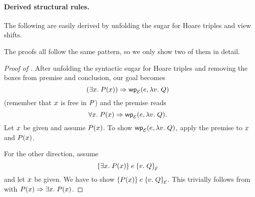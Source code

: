 \paragraph{Derived structural rules.}
The following are easily derived by unfolding the sugar for Hoare triples and view shifts.
The proofs all follow the same pattern, so we only show two of them in detail.
\begin{proof}[Proof of ]
	After unfolding the syntactic sugar for Hoare triples and removing the boxes from premise and conclusion, our goal becomes
	\[
		(\Exists \var. \prop(\var)) \Ra \dynA{\expr}{\Lam\val. \propB}{\mask}
	\]
	(remember that $x$ is free in $P$) and the premise reads
	\[
		\All \var. \prop(\var) \Ra \dynA{\expr}{\Lam\val. \propB}{\mask}.
	\]
	Let $x$ be given and assume $P(x)$.
	To show $\dynA{\expr}{\Lam\val. \propB}{\mask}$, apply the premise to $x$ and $P(x)$.
 
	For the other direction, assume
	\[
		\hoare{\Exists \var. \prop(\var)}{\expr}{\Ret\val. \propB}[\mask]
	\]
	and let $x$ be given.
	We have to show $\hoare{\prop(\var)}{\expr}{\Ret\val. \propB}[\mask]$.
	This trivially follows from  with $\prop(\var) \Ra \Exists \var. \prop(\var)$.
\end{proof}

